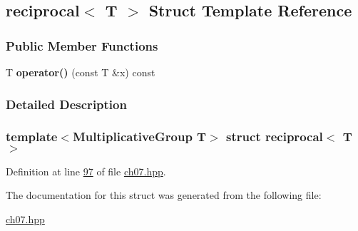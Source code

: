\hypertarget{structreciprocal}{}\subsection{reciprocal$<$ T $>$ Struct Template Reference}
\label{structreciprocal}
\subsubsection*{Public Member Functions}
\begin{DoxyCompactItemize}
\item 
\mbox{\label{structreciprocal_a4c34e5e1de65a75791fa15e3039f08dd}} 
T {\bfseries operator()} (const T \&x) const
\end{DoxyCompactItemize}


\subsubsection{Detailed Description}
\subsubsection*{template$<$Multiplicative\+Group T$>$\newline
struct reciprocal$<$ T $>$}



Definition at line \mbox{\hyperlink{ch07_8hpp_source_l00097}{97}} of file \mbox{\hyperlink{ch07_8hpp_source}{ch07.\+hpp}}.



The documentation for this struct was generated from the following file\+:\begin{DoxyCompactItemize}
\item 
\mbox{\hyperlink{ch07_8hpp}{ch07.\+hpp}}\end{DoxyCompactItemize}
